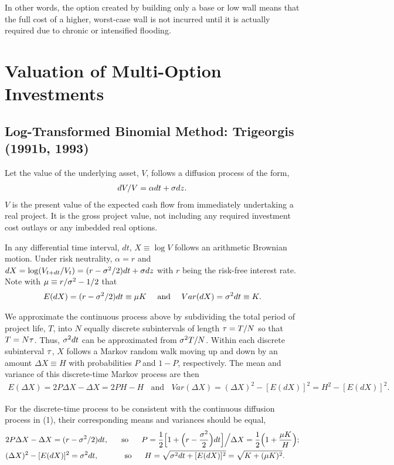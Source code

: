 \documentclass[11pt,letter]{article}
\def\a{\alpha} \def\b{\beta} \def\g{\gamma} \def\d{\delta} \def\r{\rho}
\def\D{\Delta} \def\G{\Gamma} \def\W{\Omega} \def\P{\Phi} \def\L{\Lambda} \def\Th{\Theta} \def\z{\zeta}
\theoremstyle{definition}
\theoremstyle{remark}
\numberwithin{equation}{section}
\begin{document}
In other words, the option created by building only a base or low wall means that the full cost of a higher, worst-case wall is not incurred until it is actually required due to chronic or intensified flooding.


\section{Valuation of Multi-Option Investments}
\subsection{Log-Transformed Binomial Method: Trigeorgis (1991b, 1993)}

Let the value of the underlying asset, $V$, follows a diffusion process of the form,
\begin{align*}
    dV/V=\a dt+\s dz.
\end{align*}
$V$ is the present value of the expected cash flow from immediately undertaking a real project. It is the gross project value, not including any required investment cost outlays or any imbedded real options.

In any differential time interval, $dt$, $X\equiv\log V$ follows an arithmetic Brownian motion. Under risk neutrality, $\a=r$ and $dX=\log(V_{t+dt}/V_t)=(r-\sigma^2/2)dt+\sigma dz$ with $r$ being the risk-free interest rate. Note with $\mu\equiv r/\sigma^2-1/2$ that
\begin{align*}
    E(dX)=(r-\sigma^2/2)dt\equiv\mu K~~~~\text{and}~~~~Var(dX)=\sigma^2dt\equiv K.
\end{align*}

We approximate the continuous process above by subdividing the total period of project life, $T$, into $N$ equally discrete subintervals of length $\tau=T/N$ so that $T=N\tau$. Thus, $\sigma^2dt$ can be approximated from $\sigma^2T/N$. Within each discrete subinterval $\tau$, $X$ follows a Markov random walk moving up and down by an amount $\D X\equiv H$ with probabilities $P$ and $1-P$, respectively. The mean and variance of this discrete-time Markov process are then
\begin{align*}
    E(\D X)=2P\D X-\D X=2PH-H~~~~\text{and}~~~~Var(\D X)=(\D X)^2-[E(dX)]^2=H^2-[E(dX)]^2.
\end{align*}

For the discrete-time process to be consistent with the continuous diffusion process in (1), their corresponding means and variances should be equal,
\begin{align*}
    &2P\D X-\D X=(r-\s^2/2)dt,~~~~~\text{so}~~~~~P=\frac{1}{2}\Big[1+\Big(r-\frac{\s^2}{2}\Big)dt\Big]\Big/\D X=\frac{1}{2}\Big(1+\frac{\m K}{H}\Big);\\
    &(\D X)^2-[E(dX)]^2=\s^2dt,~~~~~~~~~~\text{so}~~~~~H=\sqrt{\s^2dt+[E(dX)]^2}=\sqrt{K+(\m K)^2}.
\end{align*}
\end{document}
